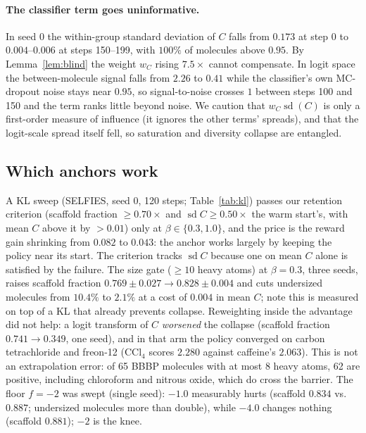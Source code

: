 \documentclass[10pt,letterpaper]{article}
\newcommand{\sd}{\operatorname{sd}}
\begin{document}
\paragraph{The classifier term goes uninformative.} In seed 0 the within-group standard deviation of $C$ falls from $0.173$ at step 0 to $0.004$--$0.006$ at steps 150--199, with $100\%$ of molecules above $0.95$. By Lemma~\ref{lem:blind} the weight $w_C$ rising $7.5\times$ cannot compensate. In logit space the between-molecule signal falls from $2.26$ to $0.41$ while the classifier's own MC-dropout noise stays near $0.95$, so signal-to-noise crosses $1$ between steps 100 and 150 and the term ranks little beyond noise. We caution that $w_C\sd(C)$ is only a first-order measure of influence (it ignores the other terms' spreads), and that the logit-scale spread itself fell, so saturation and diversity collapse are entangled.

\subsection{Which anchors work}\label{sec:anchors}
A KL sweep (SELFIES, seed 0, 120 steps; Table~\ref{tab:kl}) passes our retention criterion (scaffold fraction $\ge0.70\times$ and $\sd C\ge0.50\times$ the warm start's, with mean $C$ above it by $>0.01$) only at $\beta\in\{0.3,1.0\}$, and the price is the reward gain shrinking from $0.082$ to $0.043$: the anchor works largely by keeping the policy near its start. The criterion tracks $\sd C$ because one on mean $C$ alone is satisfied by the failure. The size gate ($\ge10$ heavy atoms) at $\beta=0.3$, three seeds, raises scaffold fraction $0.769\pm0.027\to0.828\pm0.004$ and cuts undersized molecules from $10.4\%$ to $2.1\%$ at a cost of $0.004$ in mean $C$; note this is measured on top of a KL that already prevents collapse. Reweighting inside the advantage did not help: a logit transform of $C$ \emph{worsened} the collapse (scaffold fraction $0.741\to0.349$, one seed), and in that arm the policy converged on carbon tetrachloride and freon-12 (CCl$_4$ scores $2.280$ against caffeine's $2.063$). This is not an extrapolation error: of 65 BBBP molecules with at most 8 heavy atoms, 62 are positive, including chloroform and nitrous oxide, which do cross the barrier. The floor $f=-2$ was swept (single seed): $-1.0$ measurably hurts (scaffold $0.834$ vs.\ $0.887$; undersized molecules more than double), while $-4.0$ changes nothing (scaffold $0.881$); $-2$ is the knee.
\end{document}
